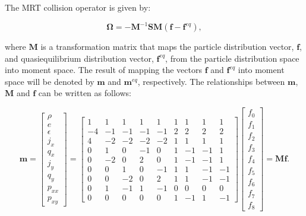 \documentclass{article}
\newcommand{\colop}{\boldsymbol{\Omega}}
\newcommand{\transM}{\mathbf{M}}
\newcommand{\relaxM}{\mathbf{S}}
\begin{document}
The MRT collision operator is given by:

\begin{equation} \label{eq:mrt-colop}
	\colop = - {\transM}^{-1} \relaxM \transM (\mathbf{f} - \mathbf{f}^{eq}),
\end{equation}

\noindent where $\transM$ is a transformation matrix that maps the particle distribution vector, $\mathbf{f}$, and quasiequilibrium distribution vector, $\mathbf{f}^{eq}$, from the particle distribution space into moment space.
The result of mapping the vectors $\mathbf{f}$ and $\mathbf{f}^{eq}$ into moment space will be denoted by $\mathbf{m}$ and $\mathbf{m}^{eq}$, respectively.
The relationships between $\mathbf{m}$, $\transM$ and $\mathbf{f}$ can be written as follows:

\begin{equation} \label{eq:transformation-matrix}
\mathbf{m} = \begin{bmatrix}
\rho \\ e \\ \epsilon \\ j_x \\ q_x \\ j_y \\ q_y \\ p_{xx} \\ p_{xy}
\end{bmatrix} = \begin{bmatrix}
1 & 1 & 1 & 1 & 1 & 1 & 1 & 1 & 1 \\
-4 & -1 & -1 & -1 & -1 & 2 & 2 & 2 & 2 \\
4 & -2 & -2 & -2 & -2 & 1 & 1 & 1 & 1 \\
0 & 1 & 0 & -1 & 0 & 1 & -1 & -1 & 1 \\
0 & -2 & 0 & 2 & 0 & 1 & -1 & -1 & 1 \\
0 & 0 & 1 & 0 & -1 & 1 & 1 & -1 & -1 \\
0 & 0 & -2 & 0 & 2 & 1 & 1 & -1 & -1 \\
0 & 1 & -1 & 1 & -1 & 0 & 0 & 0 & 0 \\
0 & 0 & 0 & 0 & 0 & 1 & -1 & 1 & -1
\end{bmatrix} \begin{bmatrix}
f_0 \\
f_1 \\
f_2 \\
f_3 \\
f_4 \\
f_5 \\
f_6 \\
f_7 \\
f_8
\end{bmatrix} = \transM \mathbf{f}.
\end{equation}
\end{document}
